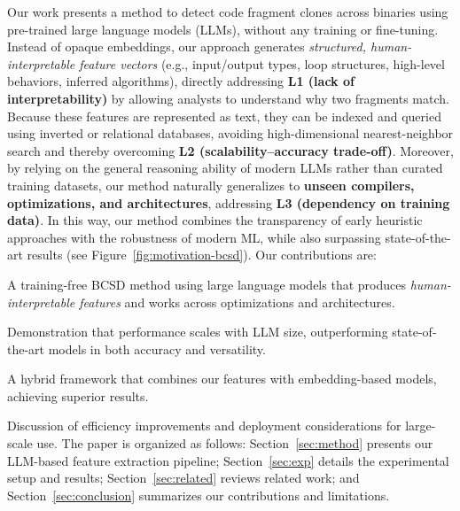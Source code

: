 Our work presents a method to detect code fragment clones across binaries using pre-trained large language models (LLMs), without any training or fine-tuning. Instead of opaque embeddings, our approach generates \textit{structured, human-interpretable feature vectors} (e.g., input/output types, loop structures, high-level behaviors, inferred algorithms), directly addressing \textbf{L1 (lack of interpretability)} by allowing analysts to understand why two fragments match. Because these features are represented as text, they can be indexed and queried using inverted or relational databases, avoiding high-dimensional nearest-neighbor search and thereby overcoming \textbf{L2 (scalability--accuracy trade-off)}. Moreover, by relying on the general reasoning ability of modern LLMs rather than curated training datasets, our method naturally generalizes to \textbf{unseen compilers, optimizations, and architectures}, addressing \textbf{L3 (dependency on training data)}. In this way, our method combines the transparency of early heuristic approaches with the robustness of modern ML, while also surpassing state-of-the-art results (see Figure~\ref{fig:motivation-bcsd}). Our contributions are:  
\squishlist
    \item A training-free BCSD method using large language models that produces \textit{human-interpretable features} and works across optimizations and architectures.  
    \item Demonstration that performance scales with LLM size, outperforming state-of-the-art models in both accuracy and versatility.  
    \item A hybrid framework that combines our features with embedding-based models, achieving superior results.  
    \item Discussion of efficiency improvements and deployment considerations for large-scale use.  
\squishlistend
The paper is organized as follows: Section~\ref{sec:method} presents our LLM-based feature extraction pipeline; Section~\ref{sec:exp} details the experimental setup and results; Section~\ref{sec:related} reviews related work; and Section~\ref{sec:conclusion} summarizes our contributions and limitations.


